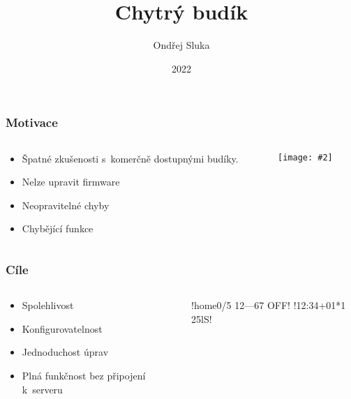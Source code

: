 \documentclass[
    utf8,
    aspectratio=169,
    17pt,  %
]{beamer}
\title{Chytrý budík}
\author{Ondřej Sluka}
\date{2022}
\newcommand{\fullsizegraphics}[2][]{%
    \centering%
    \texttt{[image: \#2]}%
}
\begin{document}
\frame{\titlepage}

\begin{frame}
    \frametitle{Motivace}
    \begin{columns}
        \begin{column}{0.5\textwidth}
            \begin{itemize}
                \item Špatné zkušenosti s~komerčně dostupnými budíky.
                \item Nelze upravit firmware
                \item Neopravitelné chyby
                \item Chybějící funkce
            \end{itemize}
        \end{column}
        \begin{column}{0.5\textwidth}
            \fullsizegraphics{sencor-SRC-330-GN}
        \end{column}
    \end{columns}
\end{frame}

\begin{frame}[fragile]
    \frametitle{Cíle}
    \begin{columns}
        \begin{column}{0.6\textwidth}
            \begin{itemize}
                \item \alert{Spolehlivost}
                \item Konfigurovatelnost
                \item Jednoduchost úprav%
                \item Plná funkčnost bez připojení k~serveru
            \end{itemize}
        \end{column}
        \begin{column}{0.4\textwidth}
            !{home}0/5 12---67 OFF!
                       !12:34+01*1  25lS!
        \end{column}
    \end{columns}
\end{frame}
\end{document}
